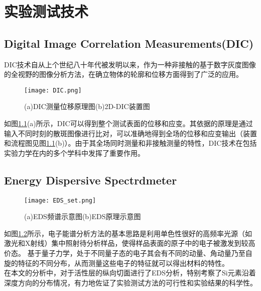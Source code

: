 \chapter{实验测试技术}
\section{Digital Image Correlation Measurements(DIC)}
DIC技术自从上个世纪八十年代被发明\cite{Sutton1983Determination}以来，作为一种非接触的基于数字灰度图像的全视野的图像分析方法，在确立物体的轮廓和位移方面得到了广泛的应用。\\
\begin{figure}
\centering   
\texttt{[image: DIC.png]}
\caption{(a)DIC测量位移原理图(b)2D-DIC装置图\cite{Tang2012Photogrammetry}}
\label{fig:dic}
\end{figure}
\indent 如图\ref{fig:dic}(a)所示，DIC可以得到整个测试表面的位移和应变。其依据的原理是通过输入不同时刻的散斑图像进行比对，可以准确地得到全场的位移和应变输出（装置和流程图见图\ref{fig:dic}(b)）。由于其全场同时测量和非接触测量的特性，DIC技术在包括实验力学在内的多个学科中发挥了重要作用。
\section{Energy Dispersive Spectrdmeter}
\begin{figure}
\centering   
\texttt{[image: EDS\_set.png]}
\caption{(a)EDS频谱示意图\cite{L2008Iron}(b)EDS原理示意图\cite{wiki:eds}}
\label{fig:EDS}
\end{figure}
如图\ref{fig:EDS}所示，电子能谱分析方法的基本思路是利用单色性很好的高频率光源（如激光和X射线）集中照射待分析样品，使得样品表面的原子中的电子被激发到较高价态。 基于量子力学，处于不同量子态的电子其会有不同的动量、角动量乃至自旋的特征的不同分布\cite{Dirac1958The}，从而测量这些电子的特征就可以得出材料的特性。\\
\indent 在本文的分析中，对于活性层的纵向切面进行了EDS分析，特别考察了Si元素沿着深度方向的分布情况，有力地佐证了实验测试方法的可行性和实验结果的科学性。